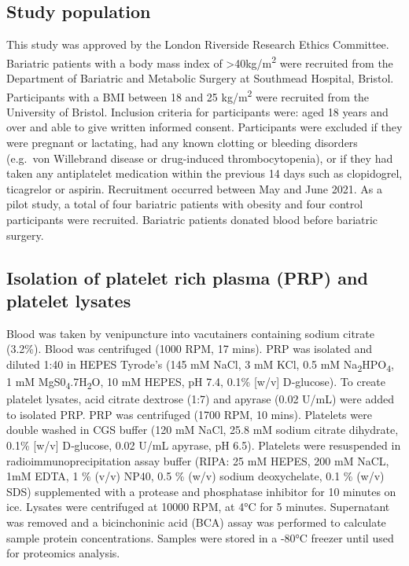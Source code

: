 \documentclass[11pt,twoside]{bristolthesis}
\begin{document}
\hypertarget{study-population-1}{%
\subsection{Study population}\label{study-population-1}}

This study was approved by the London Riverside Research Ethics Committee. Bariatric patients with a body mass index of \textgreater40kg/m\textsuperscript{2} were recruited from the Department of Bariatric and Metabolic Surgery at Southmead Hospital, Bristol. Participants with a BMI between 18 and 25 kg/m\textsuperscript{2} were recruited from the University of Bristol. Inclusion criteria for participants were: aged 18 years and over and able to give written informed consent. Participants were excluded if they were pregnant or lactating, had any known clotting or bleeding disorders (e.g.~von Willebrand disease or drug-induced thrombocytopenia), or if they had taken any antiplatelet medication within the previous 14 days such as clopidogrel, ticagrelor or aspirin. Recruitment occurred between May and June 2021. As a pilot study, a total of four bariatric patients with obesity and four control participants were recruited. Bariatric patients donated blood before bariatric surgery.

\hypertarget{isolation-of-platelet-rich-plasma-prp-and-platelet-lysates}{%
\subsection{Isolation of platelet rich plasma (PRP) and platelet lysates}\label{isolation-of-platelet-rich-plasma-prp-and-platelet-lysates}}

Blood was taken by venipuncture into vacutainers containing sodium citrate (3.2\%). Blood was centrifuged (1000 RPM, 17 mins). PRP was isolated and diluted 1:40 in HEPES Tyrode's (145 mM NaCl, 3 mM KCl, 0.5 mM Na\textsubscript{2}HPO\textsubscript{4}, 1 mM MgS0\textsubscript{4}.7H\textsubscript{2}O, 10 mM HEPES, pH 7.4, 0.1\% {[}w/v{]} D‐glucose). To create platelet lysates, acid citrate dextrose (1:7) and apyrase (0.02 U/mL) were added to isolated PRP. PRP was centrifuged (1700 RPM, 10 mins). Platelets were double washed in CGS buffer (120 mM NaCl, 25.8 mM sodium citrate dihydrate, 0.1\% {[}w/v{]} D‐glucose, 0.02 U/mL apyrase, pH 6.5). Platelets were resuspended in radioimmunoprecipitation assay buffer (RIPA: 25 mM HEPES, 200 mM NaCL, 1mM EDTA, 1 \% (v/v) NP40, 0.5 \% (w/v) sodium deoxychelate, 0.1 \% (w/v) SDS) supplemented with a protease and phosphatase inhibitor for 10 minutes on ice. Lysates were centrifuged at 10000 RPM, at 4°C for 5 minutes. Supernatant was removed and a bicinchoninic acid (BCA) assay was performed to calculate sample protein concentrations. Samples were stored in a -80°C freezer until used for proteomics analysis.
\end{document}
